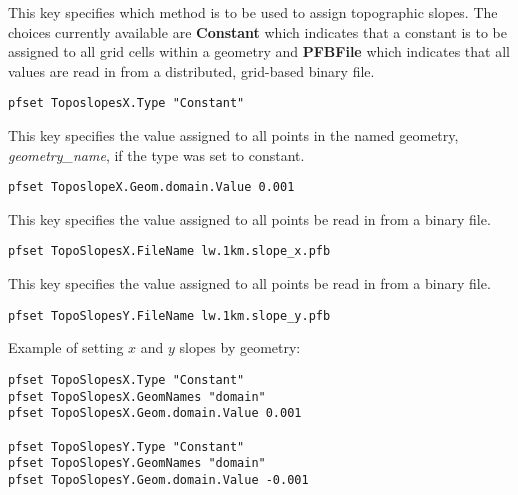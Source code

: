 {
This key specifies which method is to be used to assign topographic slopes.  The choices currently
available are {\bf Constant} which indicates that a constant is to be
assigned to all grid cells within a geometry and {\bf PFBFile} which indicates that all values are read in from a distributed, grid-based \parflow{} binary file.
}
\begin{display}\begin{verbatim}
pfset ToposlopesX.Type "Constant"
\end{verbatim}\end{display}

{
This key specifies the value assigned to all points in the named
geometry, {\em geometry\_name}, if the type was set to constant.
}
\begin{display}\begin{verbatim}
pfset ToposlopeX.Geom.domain.Value 0.001
\end{verbatim}\end{display}

{
This key specifies the value assigned to all points be read in from a \parflow{} binary file.
}
\begin{display}\begin{verbatim}
pfset TopoSlopesX.FileName lw.1km.slope_x.pfb
\end{verbatim}\end{display}

{
This key specifies the value assigned to all points be read in from a \parflow{} binary file.
}
\begin{display}\begin{verbatim}
pfset TopoSlopesY.FileName lw.1km.slope_y.pfb
\end{verbatim}\end{display}

Example of setting $x$ and $y$ slopes by geometry:
\begin{display}\begin{verbatim}
pfset TopoSlopesX.Type "Constant"
pfset TopoSlopesX.GeomNames "domain"
pfset TopoSlopesX.Geom.domain.Value 0.001

pfset TopoSlopesY.Type "Constant"
pfset TopoSlopesY.GeomNames "domain"
pfset TopoSlopesY.Geom.domain.Value -0.001
\end{verbatim}\end{display}

